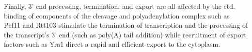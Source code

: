 Finally, 3' end processing, termination, and export are all affected by the \gls{ctd}. binding of components of the cleavage and polyadenylation complex such as Pcf11 and Rtt103 stimulate the termination of transcription and the processing of the transcript's 3' end (such as poly(A) tail addition) while recruitment of export factors such as Yra1 direct a rapid and efficient export to the cytoplasm.




\clearpage